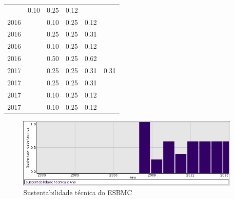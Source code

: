 \begin{table}[H]
\begin{tabular}{| l | c | c | c | c | c |}
          &
          0.10
          &
          0.25
          &
          0.12
          &
          \\
            2016
          &
          
          &
          0.10
          &
          0.25
          &
          0.12
          &
          \\
            2016
          &
          
          &
          0.25
          &
          0.25
          &
          0.31
          &
          \\
            2016
          &
          
          &
          0.10
          &
          0.25
          &
          0.12
          &
          \\
            2016
          &
          
          &
          0.50
          &
          0.25
          &
          0.62
          &
          \\
\hline
            2017
          &
          
          &
          0.25
          &
          0.25
          &
          0.31
          &
            {\color{red} 0.31}
          \\
            2017
          &
          
          &
          0.25
          &
          0.25
          &
          0.31
          &
          \\
            2017
          &
          
          &
          0.10
          &
          0.25
          &
          0.12
          &
          \\
            2017
          &
          
          &
          0.10
          &
          0.25
          &
          0.12
          &
          \\
\hline
\end{tabular}
\end{table}

\begin{figure}[h]
  \center
  \includegraphics[scale=0.50]{imagens/softwares-charts/esbmc.png}
  \caption{Sustentabilidade técnica do ESBMC}
\end{figure}


